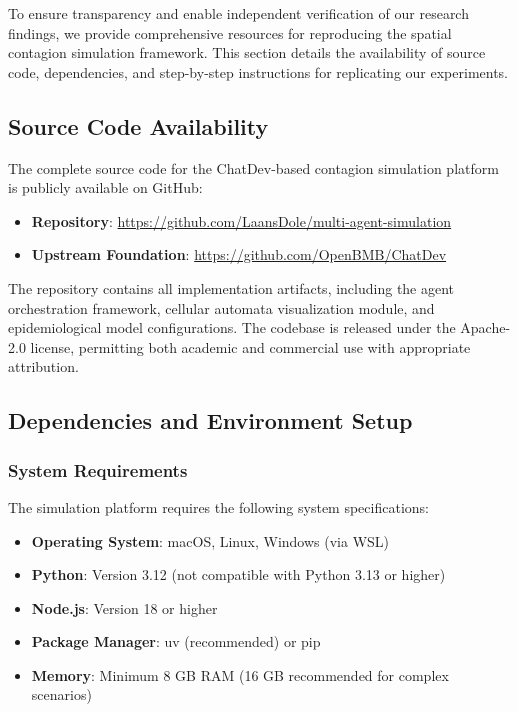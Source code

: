 \label{sec:reproducibility}

To ensure transparency and enable independent verification of our research findings, we provide comprehensive resources for reproducing the spatial contagion simulation framework. This section details the availability of source code, dependencies, and step-by-step instructions for replicating our experiments.

\subsection{Source Code Availability}

The complete source code for the ChatDev-based contagion simulation platform is publicly available on GitHub:
\begin{itemize}
    \item \textbf{Repository}: \url{https://github.com/LaansDole/multi-agent-simulation}
    \item \textbf{Upstream Foundation}: \url{https://github.com/OpenBMB/ChatDev}
\end{itemize}

The repository contains all implementation artifacts, including the agent orchestration framework, cellular automata visualization module, and epidemiological model configurations. The codebase is released under the Apache-2.0 license, permitting both academic and commercial use with appropriate attribution.

\subsection{Dependencies and Environment Setup}

\subsubsection{System Requirements}

The simulation platform requires the following system specifications:
\begin{itemize}
    \item \textbf{Operating System}: macOS, Linux, Windows (via WSL)
    \item \textbf{Python}: Version 3.12 (not compatible with Python 3.13 or higher)
    \item \textbf{Node.js}: Version 18 or higher
    \item \textbf{Package Manager}: uv (recommended) or pip
    \item \textbf{Memory}: Minimum 8 GB RAM (16 GB recommended for complex scenarios)
\end{itemize}

